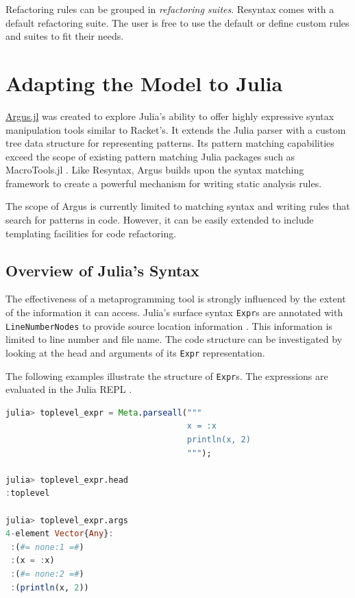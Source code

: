 \documentclass{juliacon}
\begin{document}
Refactoring rules can be grouped in \emph{refactoring suites}. Resyntax
comes with a default refactoring suite. The user is free to use the
default or define custom rules and suites to fit their needs.

\section{Adapting the Model to Julia}
\label{sec:org7db2573}

\href{https://github.com/iuliadmtru/Argus.jl}{Argus.jl} was created to explore Julia's ability to offer highly
expressive syntax manipulation tools similar to Racket's. It extends
the Julia parser with a custom tree data structure for representing
patterns. Its pattern matching capabilities exceed the scope of
existing pattern matching Julia packages such as MacroTools.jl
\cite{macro_tools}. Like Resyntax, Argus builds upon the syntax
matching framework to create a powerful mechanism for writing static
analysis rules.

The scope of Argus is currently limited to matching syntax and writing
rules that search for patterns in code. However, it can be easily
extended to include templating facilities for code refactoring.

\subsection{Overview of Julia's Syntax}
\label{sec:org1f20944}

The effectiveness of a metaprogramming tool is strongly influenced by
the extent of the information it can access. Julia's surface syntax
\texttt{Expr}s are annotated with \texttt{LineNumberNodes} to provide source
location information \cite{julia_asts}. This information is limited
to line number and file name. The code structure can be investigated
by looking at the head and arguments of its \texttt{Expr} representation.

The following examples illustrate the structure of \texttt{Expr}s. The
expressions are evaluated in the Julia REPL \cite{julia_repl}.

\begin{lstlisting}[language=Julia]
julia> toplevel_expr = Meta.parseall("""
                                     x = :x
                                     println(x, 2)
                                     """);

julia> toplevel_expr.head
:toplevel

julia> toplevel_expr.args
4-element Vector{Any}:
 :(#= none:1 =#)
 :(x = :x)
 :(#= none:2 =#)
 :(println(x, 2))
\end{lstlisting}
\end{document}

